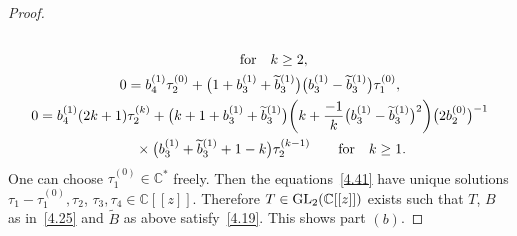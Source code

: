 \documentclass[pdftex]{sigma}%
\numberwithin{equation}{section}
\numberwithin{figure}{section}
\newcommand{\C}{{\mathbb C}}
\newcommand{\www}{\widetilde}
\begin{document}
\begin{proof}
\begin{gather}
\\
\qquad\text{for}\quad k\geq 2,\nonumber
\\
0= b_4^{(1)}\tau_2^{(0)}+\big(1+b_3^{(1)}+\www b_3^{(1)}\big)
\big(b_3^{(1)}-\www b_3^{(1)}\big)\tau_1^{(0)},\nonumber
\\
0= b_4^{(1)}(2k+1)\tau_2^{(k)}+
\big(k+1+b_3^{(1)}+\www b_3^{(1)}\big)\bigg(k+\frac{-1}{k}\big(b_3^{(1)}-\www b_3^{(1)}\big)^2\bigg)\big(2b_2^{(0)}\big)^{-1}
\nonumber
\\ \hphantom{0=}
{}\times\big(b_3^{(1)}+\www b_3^{(1)}+1-k\big)\tau_2^{(k-1)}
\qquad\text{for}\quad k\geq 1.
\label{4.41}
\end{gather}
One can choose $\tau_1^{(0)}\in\C^*$ freely.
Then the equations~\eqref{4.41} have unique
solutions $\tau_1-\tau_1^{(0)},\tau_2$, $\tau_3,\tau_4\in\C[[z]]$.
Therefore $T\in {\rm GL}_2(\C[[z]])$ exists such that $T$,
$B$ as in~\eqref{4.25} and $\www B$ as above satisfy~\eqref{4.19}. This shows part $(b)$.
\end{proof}
\end{document}
